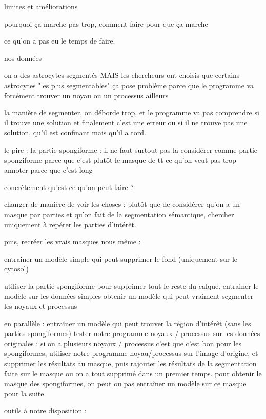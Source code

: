 

limites et améliorations

pourquoi ça marche pas trop, comment faire pour que ça marche

ce qu'on a pas eu le temps de faire. 



nos données 

on a des astrocytes segmentés MAIS les chercheurs ont choisis que certains astrocytes "les plus segmentables" 
ça pose problème parce que le programme va forcément trouver un noyau ou un processus ailleurs 

la manière de segmenter, on déborde trop, et le programme va pas comprendre si il trouve une solution et finalement c'est une erreur ou si il ne trouve pas une solution, qu'il est confinant mais qu'il a tord. 

le pire : la partie spongiforme : il ne faut surtout pas la considérer comme partie spongiforme parce que c'est plutôt le masque de tt ce qu'on veut pas trop annoter parce que c'est long


concrètement qu'est ce qu'on peut faire ? 

changer de manière de voir les choses : plutôt que de considérer qu'on a un masque par parties et qu'on fait de la segmentation sémantique, chercher uniquement à repérer les parties d'intérêt. 

puis, recréer les vrais masques nous même : 

entrainer un modèle simple qui peut supprimer le fond (uniquement sur le cytosol)

utiliser la partie spongiforme pour supprimer tout le reste du calque. 
entrainer le modèle sur les données simples 
obtenir un modèle qui peut vraiment segmenter les noyaux et processus

en parallèle : 
entraîner un modèle qui peut trouver la région d'intérêt (sans les parties spongiformes) 
tester notre programme noyaux / processus sur les données originales : si on a plusieurs noyaux / processus c'est que c'est bon
pour les spongiformes,  utiliser notre programme noyau/processus sur l'image d'origine, et supprimer les résultats au masque, puis rajouter les résultats de la segmentation faite sur le masque ou on a tout supprimé dans un premier temps. pour obtenir le masque des spongiformes, on peut ou pas entraîner un modèle sur ce masque pour la suite. 



outils à notre disposition : 

